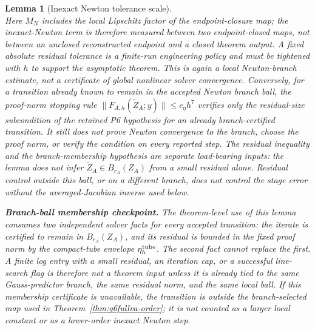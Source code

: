 \documentclass[preprint,12pt]{elsarticle}
\newtheorem{lemma}{Lemma}
\begin{document}
\begin{lemma}[Inexact Newton tolerance scale]
\begin{equation}
\end{equation}
Here \(M_N\) includes the local Lipschitz factor of the endpoint-closure map;
the inexact-Newton term is therefore measured between two endpoint-closed
maps, not between an unclosed reconstructed endpoint and a closed theorem
output.
A fixed absolute residual tolerance is a finite-run engineering policy and
must be tightened with \(h\) to support the asymptotic theorem. This is again
a local Newton-branch estimate, not a certificate of global nonlinear solver
convergence.
Conversely, for a transition already known to remain in the accepted Newton
branch ball, the proof-norm stopping rule
\(\|F_{A,h}(\widetilde Z_A;y)\|\le c_\eta h^7\) verifies only the
residual-size subcondition of the retained P6 hypothesis for an already
branch-certified transition. It still does not prove Newton convergence to
the branch, choose the proof norm, or verify the condition on every reported
step.
The residual inequality and the branch-membership hypothesis are separate
load-bearing inputs: the lemma does not infer
\(\widetilde Z_A\in B_{r_A}(Z_A)\) from a small residual alone. Residual
control outside this ball, or on a different branch, does not control the
stage error without the averaged-Jacobian inverse used below.

\noindent\textbf{Branch-ball membership checkpoint.}
The theorem-level use of this lemma consumes two independent solver facts for
every accepted transition: the iterate is certified to remain in
\(B_{r_A}(Z_A)\), and its residual is bounded in the fixed proof norm by the
compact-tube envelope \(\eta_h^{\rm tube}\). The second fact cannot replace
the first. A finite log entry with a small residual, an iteration cap, or a
successful line-search flag is therefore not a theorem input unless it is
already tied to the same Gauss-predictor branch, the same residual norm, and
the same local ball. If this membership certificate is unavailable, the
transition is outside the branch-selected map used in
Theorem~\ref{thm:g6fullva-order}; it is not counted as a larger local
constant or as a lower-order inexact Newton step.


\end{lemma}
\end{document}
